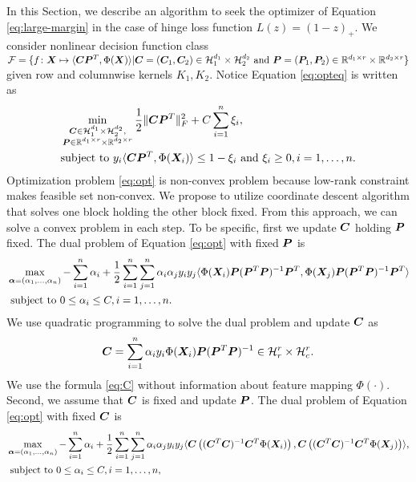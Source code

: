 \documentclass[mathptm]{statsoc}
\begin{document}
\label{sec:alg}
In this Section, we describe an algorithm to seek the optimizer of Equation  \eqref{eq:large-margin} in the case of hinge loss function $L(z) = (1-z)_+$. We consider nonlinear decision function class $\mathcal{F} = \{f\colon\bm X\mapsto\langle\bm C \bm{P}^T,\Phi(\bm X)\rangle|\bm C = (\bm C_1,\bm C_2)\in\mathcal{H}_1^{d_1}\times \mathcal{H}_2^{d_2} \text{ and }\bm{P} = (\bm{P}_1,\bm{P}_2)\in\mathbb{R}^{d_1\times r} \times \mathbb{R}^{d_2\times r}\}$ given row and columnwise kernels $K_1,K_2$.
Notice Equation \eqref{eq:opteq} is written as 
\begin{align}
    \label{eq:opt}
    &\min_{\substack{\bm C\in\mathcal{H}_1^{d_1}\times \mathcal{H}_2^{d_2} ,\\\bm{P}\in\mathbb{R}^{d_1\times r} \times \mathbb{R}^{d_2\times r}}}\frac{1}{2}\lVert\bm C\bm{P}^T\rVert_F^2+ C\sum_{i=1}^n \xi_i,\\
    &\text{subject to } y_i\langle\bm C\bm{P}^T,\Phi(\bm X_i)\rangle\leq 1-\xi_i\text{ and } \xi_i\geq 0, i=1,\ldots,n.
\end{align}
Optimization problem \eqref{eq:opt} is non-convex problem because low-rank constraint makes feasible set non-convex.
We propose to utilize coordinate descent algorithm that solves one block holding the other block fixed. From this approach, we can solve a convex problem in each step.
To be specific, first we update $\bm C$ holding $\bm{P}$ fixed.
The dual problem of Equation \eqref{eq:opt} with fixed $\bm{P}$ is 
\begin{align}
    \label{eq:dual1}
    &\max_{\bm\alpha = (\alpha_1,\ldots,\alpha_n)}-\sum_{i=1}^n\alpha_i + \frac{1}{2}\sum_{i=1}^n\sum_{j=1}^n \alpha_i\alpha_j y_iy_j \langle \Phi(\bm X_i)\bm{P}(\bm{P}^T\bm{P})^{-1}\bm{P}^T,\Phi(\bm X_j)\bm{P}(\bm{P}^T\bm{P})^{-1}\bm{P}^T\rangle\\
    &\text{ subject to }  0\leq \alpha_i\leq C, i=1,\ldots,n.
\end{align}
We use quadratic programming to solve the dual problem and update $\bm C$ as
\begin{align}\label{eq:C}
    \bm C = \sum_{i=1}^n \alpha_iy_i \Phi(\bm X_i) \bm{P}(\bm{P}^T\bm{P})^{-1}\in\mathcal{H}_r^r\times \mathcal{H}_c^r.
\end{align}
We use the formula \eqref{eq:C} without information about feature mapping $\Phi(\cdot)$.
Second, we assume that $\bm C$ is fixed and update $\bm{P}$. The dual problem of Equation \eqref{eq:opt} with fixed $\bm C$ is 
\begin{align}
    \label{eq:dual2}
    &\max_{\bm\alpha = (\alpha_1,\ldots,\alpha_n)}-\sum_{i=1}^n\alpha_i + \frac{1}{2}\sum_{i=1}^n\sum_{j=1}^n \alpha_i\alpha_j y_iy_j\langle 
    \bm C\left((\bm C^T\bm C)^{-1}\bm C^T\Phi(\bm X_i)\right),\bm C\left((\bm C^T\bm C)^{-1}\bm C^T\Phi(\bm X_j)\right)\rangle,\\
    &\text{ subject to }  0\leq \alpha_i\leq C, i=1,\ldots,n,
\end{align}
\end{document}
